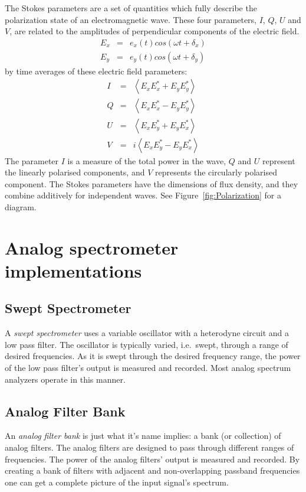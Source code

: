 \documentclass{ws-rv961x669}
\begin{document}
The Stokes parameters are a set of quantities which fully describe the polarization state of an electromagnetic wave. These four parameters, $I$, $Q$, $U$ and $V$, are related to the amplitudes of perpendicular components of the electric field.
\begin{eqnarray}
E_{x} & = & e_{x}(t)cos(\omega t+\delta_{x})\\
E_{y} & = & e_{y}(t)cos(\omega t+\delta_{y})
\end{eqnarray}
by time averages of these electric field parameters:
\begin{eqnarray}
I & = & \left\langle E_{x}E_{x}^{*}+E_{y}E_{y}^{*}\right\rangle \\
Q & = & \left\langle E_{x}E_{x}^{*}-E_{y}E_{y}^{*}\right\rangle \\
U & = & \left\langle E_{x}E_{y}^{*}+E_{y}E_{x}^{*}\right\rangle \\
V & = & i\left\langle E_{x}E_{y}^{*}-E_{y}E_{x}^{*}\right\rangle 
\end{eqnarray}
The parameter $I$ is a measure of the total power in the wave, $Q$
and $U$ represent the linearly polarised components, and $V$ represents
the circularly polarised component. The Stokes parameters have the
dimensions of flux density, and they combine additively for independent
waves. See Figure~\ref{fig:Polarization} for a diagram.


\section{Analog spectrometer implementations}
\subsection{Swept Spectrometer}\label{swept-spectrometer}

A \emph{swept spectrometer} uses a variable oscillator with a heterodyne
circuit and a low pass filter. The oscillator is typically varied,
i.e.~swept, through a range of desired frequencies. As it is swept
through the desired frequency range, the power of the low pass filter's
output is measured and recorded. Most analog spectrum analyzers operate
in this manner.

\subsection{Analog Filter Bank}\label{analog-filter-bank}

An \emph{analog filter bank} is just what it's name implies: a bank (or
collection) of analog filters. The analog filters are designed to pass
through different ranges of frequencies. The power of the analog
filters' output is measured and recorded. By creating a bank of filters
with adjacent and non-overlapping passband frequencies one can get a
complete picture of the input signal's spectrum.
\end{document}

